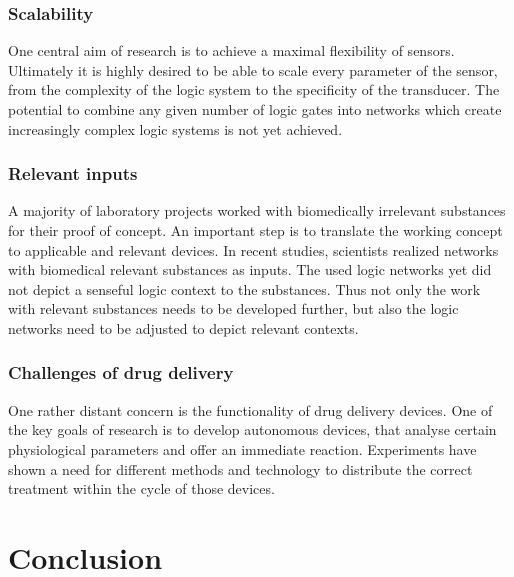 \documentclass[runningheads]{llncs}
\begin{document}
\subsubsection{Scalability}	One central aim of research is to achieve a maximal flexibility of sensors. Ultimately it is highly desired to be able to scale every parameter of the sensor, from the complexity of the logic system to the specificity of the transducer. The potential to combine any given number of logic gates into networks which create increasingly complex logic systems is not yet achieved.\cite{original}

\subsubsection{Relevant inputs}	A majority of laboratory projects worked with biomedically irrelevant substances for their proof of concept. An important step is to translate the working concept to applicable and relevant devices. In recent studies, scientists realized networks with biomedical relevant substances as inputs. The used logic networks yet did not depict a senseful logic context to the substances. Thus not only the work with relevant substances needs to be developed further, but also the logic networks need to be adjusted to depict relevant contexts.\cite{original}

\subsubsection{Challenges of drug delivery}	One rather distant concern is the functionality of drug delivery devices. One of the key goals of research is to develop autonomous devices, that analyse certain physiological parameters and offer an immediate reaction. Experiments have shown a need for different methods and technology to distribute the correct treatment within the cycle of those devices. \cite{original}


\section{Conclusion}
\end{document}
